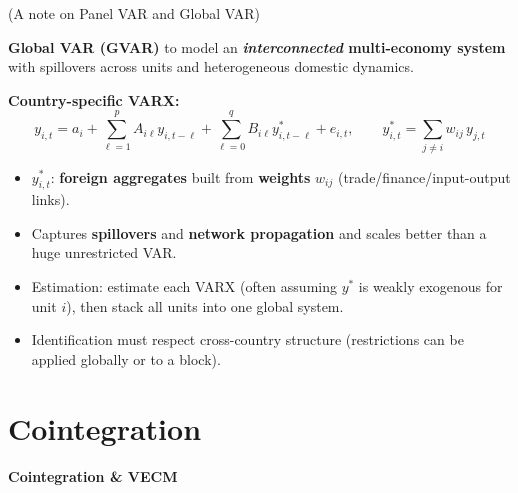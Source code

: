 \documentclass{beamer}
\begin{document}
\begin{frame}{(A note on Panel VAR and Global VAR)}
\small

\textbf{Global VAR (GVAR)} to model an\textbf{ \emph{interconnected} multi-economy system} with spillovers across units and heterogeneous domestic dynamics.

\vspace{2pt}
\textbf{Country-specific VARX:}
\[
y_{i,t} = a_i + \sum_{\ell=1}^p A_{i\ell} y_{i,t-\ell}
        + \sum_{\ell=0}^q B_{i\ell} y^\ast_{i,t-\ell} + e_{i,t},
\qquad
y^\ast_{i,t}=\sum_{j\neq i} w_{ij}\, y_{j,t}
\]
\begin{itemize}
  \item $y^\ast_{i,t}$: \textbf{foreign aggregates} built from \textbf{weights} $w_{ij}$ (trade/finance/input-output links). 
  \item Captures \textbf{spillovers} and \textbf{network propagation} and scales better than a huge unrestricted VAR.
  \item Estimation: estimate each VARX (often assuming $y^\ast$ is weakly exogenous for unit $i$), then stack all units into one global system.
  \item Identification must respect cross-country structure (restrictions can be applied globally or to a block).
\end{itemize}

\end{frame}



\section{Cointegration}


\begin{frame}
  \centering
  \vfill
  {\LARGE \textbf{Cointegration \& VECM}}\\[0.4cm]
  \vfill
\end{frame}
\end{document}
